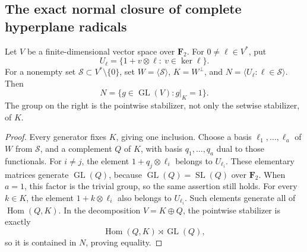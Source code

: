 \subsection{The exact normal closure of complete hyperplane radicals}

\begin{lemma}
\label{lem:full-radicals-pointwise-stabilizer}
Let \(V\) be a finite-dimensional vector space over \(\mathbf F_2\).
For \(0\ne\ell\in V^*\), put
\[
 U_\ell=\{1+v\otimes\ell:\ v\in\ker\ell\}.
\]
For a nonempty set \(\mathscr S\subset V^*\setminus\{0\}\), set
\(W=\langle\mathscr S\rangle\), \(K=W^\perp\), and
\(N=\langle U_\ell:\ell\in\mathscr S\rangle\).
Then
\[
             N=\{g\in\operatorname{GL}(V):g|_K=1\}.
                                                               \tag{NR1}
\]
The group on the right is the pointwise stabilizer, not only the
setwise stabilizer, of \(K\).
\end{lemma}
\begin{proof}
Every generator fixes \(K\), giving one inclusion.  Choose a basis
\(\ell_1,\ldots,\ell_a\) of \(W\) from \(\mathscr S\), and a
complement \(Q\) of \(K\), with basis \(q_1,\ldots,q_a\) dual to
those functionals.  For \(i\ne j\), the element
\(1+q_j\otimes\ell_i\) belongs to \(U_{\ell_i}\).  These elementary
matrices generate \(\operatorname{GL}(Q)\), because
\(\operatorname{GL}(Q)=\operatorname{SL}(Q)\) over \(\mathbf F_2\).
When \(a=1\), this factor is the trivial group, so the same assertion
still holds.  For every \(k\in K\), the element
\(1+k\otimes\ell_i\) also belongs to \(U_{\ell_i}\).  Such elements
generate all of \(\operatorname{Hom}(Q,K)\).  In the decomposition
\(V=K\oplus Q\), the pointwise stabilizer is exactly
\[
       \operatorname{Hom}(Q,K)\rtimes\operatorname{GL}(Q),
\]
so it is contained in \(N\), proving equality.
\end{proof}

